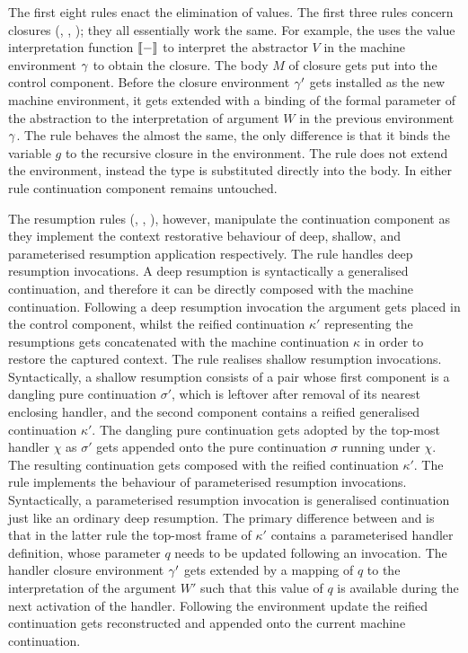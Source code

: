 \documentclass[12pt,phd,lfcs,twoside,openright,logo,leftchapter,normalheadings]{infthesis}
\theoremstyle{plain}
\theoremstyle{definition}
\begin{document}
The first eight rules enact the elimination of values.
%
The first three rules concern closures (, ,
); they all essentially work the same. For example, the
 uses the value interpretation function $\val{-}$ to
interpret the abstractor $V$ in the machine environment $\gamma$ to
obtain the closure. The body $M$ of closure gets put into the control
component. Before the closure environment $\gamma'$ gets installed as
the new machine environment, it gets extended with a binding of the
formal parameter of the abstraction to the interpretation of argument
$W$ in the previous environment $\gamma$. The rule  behaves
the almost the same, the only difference is that it binds the variable
$g$ to the recursive closure in the environment. The rule
 does not extend the environment, instead the type is
substituted directly into the body. In either rule continuation
component remains untouched.

The resumption rules (, ,
), however, manipulate the continuation component
as they implement the context restorative behaviour of deep, shallow,
and parameterised resumption application respectively. The
 rule handles deep resumption invocations. A deep
resumption is syntactically a generalised continuation, and therefore
it can be directly composed with the machine continuation. Following a
deep resumption invocation the argument gets placed in the control
component, whilst the reified continuation $\kappa'$ representing the
resumptions gets concatenated with the machine continuation $\kappa$
in order to restore the captured context.
%
The rule  realises shallow resumption
invocations. Syntactically, a shallow resumption consists of a pair
whose first component is a dangling pure continuation $\sigma'$, which
is leftover after removal of its nearest enclosing handler, and the
second component contains a reified generalised continuation
$\kappa'$. The dangling pure continuation gets adopted by the top-most
handler $\chi$ as $\sigma'$ gets appended onto the pure continuation
$\sigma$ running under $\chi$. The resulting continuation gets
composed with the reified continuation $\kappa'$.
%
The rule  implements the behaviour of
parameterised resumption invocations. Syntactically, a parameterised
resumption invocation is generalised continuation just like an
ordinary deep resumption. The primary difference between 
and  is that in the latter rule the top-most frame
of $\kappa'$ contains a parameterised handler definition, whose
parameter $q$ needs to be updated following an invocation. The handler
closure environment $\gamma'$ gets extended by a mapping of $q$ to the
interpretation of the argument $W'$ such that this value of $q$ is
available during the next activation of the handler. Following the
environment update the reified continuation gets reconstructed and
appended onto the current machine continuation.
\end{document}
